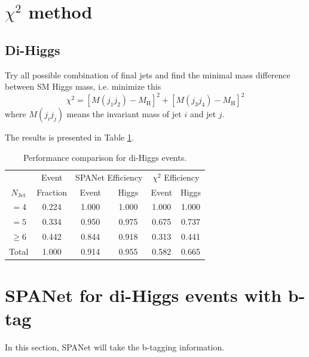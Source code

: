 \documentclass[12pt]{article}
\begin{document}


\section{\texorpdfstring{$\chi^2$}{chi square} method}%
\label{sec:chi_2_method}
	\subsection{Di-Higgs}%
	\label{sub:di_higgs}
		Try all possible combination of final jets and find the minimal mass difference between SM Higgs mass, i.e. minimize this
		\begin{equation}
			\chi^2 = [M(j_1j_2)-M_\text{H}]^2 + [M(j_3j_4)-M_\text{H}]^2
		\end{equation}
		where $M(j_ij_j)$ means the invariant mass of jet $i$ and jet $j$.

		The results is presented in Table \ref{tab:comparison_SPANet_and_chi2}.

		\begin{table}[htpb]
			\centering
			\caption{Performance comparison for di-Higgs events.}
			\label{tab:comparison_SPANet_and_chi2}
			\begin{tabular}{c|c|cc|cc}
					  & Event    & \multicolumn{2}{|c|}{SPANet Efficiency} & \multicolumn{2}{|c}{ $\chi^2$ Efficiency} \\
				$N_\text{Jet}$ & Fraction & Event             & Higgs             & Event            & Higgs           \\
				\hline
				$=4$	  &   0.224       &     1.000       &   1.000       &   1.000           &    1.000             \\
				$=5$	  &   0.334       &     0.950       &   0.975       &   0.675           &    0.737            \\
				$\ge 6$	  &   0.442       &     0.844       &   0.918		&   0.313           &    0.441            \\
				Total	  &   1.000       &     0.914       &   0.955       &   0.582           &    0.665            
			\end{tabular}
		\end{table}


\section{SPANet for di-Higgs events with b-tag}%
\label{sec:spanet_for_di_higgs_events_with_b_tag}
	In this section, SPANet will take the b-tagging information.
\end{document}
